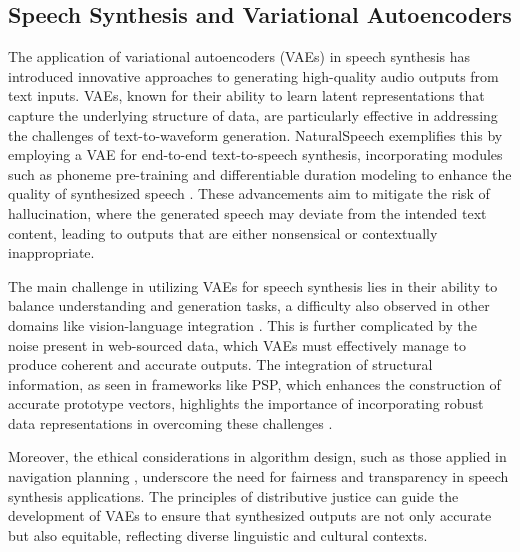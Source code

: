 \subsection{Speech Synthesis and Variational Autoencoders} \label{subsec:Speech Synthesis and Variational Autoencoders}

The application of variational autoencoders (VAEs) in speech synthesis has introduced innovative approaches to generating high-quality audio outputs from text inputs. VAEs, known for their ability to learn latent representations that capture the underlying structure of data, are particularly effective in addressing the challenges of text-to-waveform generation. NaturalSpeech exemplifies this by employing a VAE for end-to-end text-to-speech synthesis, incorporating modules such as phoneme pre-training and differentiable duration modeling to enhance the quality of synthesized speech \cite{tan2022naturalspeechendtoendtextspeech}. These advancements aim to mitigate the risk of hallucination, where the generated speech may deviate from the intended text content, leading to outputs that are either nonsensical or contextually inappropriate.



The main challenge in utilizing VAEs for speech synthesis lies in their ability to balance understanding and generation tasks, a difficulty also observed in other domains like vision-language integration \cite{BLIP:Boots6}. This is further complicated by the noise present in web-sourced data, which VAEs must effectively manage to produce coherent and accurate outputs. The integration of structural information, as seen in frameworks like PSP, which enhances the construction of accurate prototype vectors, highlights the importance of incorporating robust data representations in overcoming these challenges \cite{ge2024psppretrainingstructureprompt}.



Moreover, the ethical considerations in algorithm design, such as those applied in navigation planning \cite{brandao2020fairnavigationplanninghumanitarian}, underscore the need for fairness and transparency in speech synthesis applications. The principles of distributive justice can guide the development of VAEs to ensure that synthesized outputs are not only accurate but also equitable, reflecting diverse linguistic and cultural contexts.














